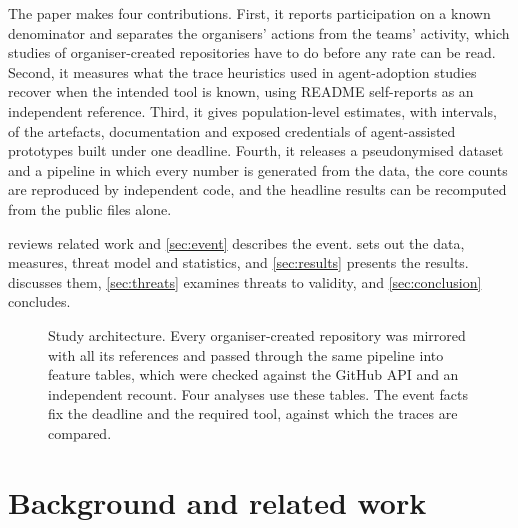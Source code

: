 \documentclass{article}
\begin{document}
The paper makes four contributions. First, it reports participation on a known denominator and separates the organisers' actions from the teams' activity, which studies of organiser-created repositories have to do before any rate can be read. Second, it measures what the trace heuristics used in agent-adoption studies recover when the intended tool is known, using README self-reports as an independent reference. Third, it gives population-level estimates, with intervals, of the artefacts, documentation and exposed credentials of agent-assisted prototypes built under one deadline. Fourth, it releases a pseudonymised dataset and a pipeline in which every number is generated from the data, the core counts are reproduced by independent code, and the headline results can be recomputed from the public files alone.

 reviews related work and \cref{sec:event} describes the event.  sets out the data, measures, threat model and statistics, and \cref{sec:results} presents the results.  discusses them, \cref{sec:threats} examines threats to validity, and \cref{sec:conclusion} concludes.

\begin{figure}[t]
  \centering
  
  \caption{Study architecture. Every organiser-created repository was mirrored with all its references and passed through the same pipeline into feature tables, which were checked against the GitHub API and an independent recount. Four analyses use these tables. The event facts fix the deadline and the required tool, against which the traces are compared.}
  \label{fig:overview}
\end{figure}

\section{Background and related work}\label{sec:related}
\end{document}

